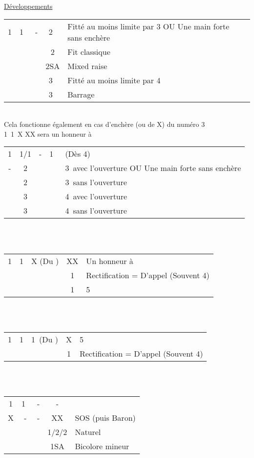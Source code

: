 \documentclass[a4paper, oneside, 11pt]{report}
\begin{document}
	\underline{Développements}\\
	\begin{tabular}{cccc|l}
	1\carreau & 1\coeur\  & - & 2\carreau\ & Fitté au moins limite par 3 OU Une main forte sans enchère\\
	&&& 2\coeur & Fit classique\\
	&&& 2SA & Mixed raise\\
	&&& 3\carreau\ & Fitté au moins limite par 4\\
	&&& 3\coeur\ & Barrage\\
	\end{tabular}\\
	Cela fonctionne également en cas d'enchère (ou de X) du numéro 3\\
	1\carreau\ 1\coeur\ X XX sera un honneur à \coeur\\

	\begin{tabular}{cccc|l}
	1\trefle & 1\carreau/1\coeur  & - & 1\pique\ & (Dès 4\pique)\\
	- & 2\trefle &&& 3\pique\ avec l'ouverture OU Une main forte sans enchère\\
	& 2\pique &&& 3\pique\ sans l'ouverture\\
	& 3\trefle &&& 4\pique\ avec l'ouverture\\
	& 3\pique &&& 4\pique\ sans l'ouverture\\
	\end{tabular}\\\\

	\begin{tabular}{cccc|l}
	1\trefle & 1\carreau & X (Du \coeur) & XX & Un honneur à \carreau\\
	&&& 1\coeur & Rectification = D'appel (Souvent 4\pique)\\
	&&& 1\pique & 5\pique\\
	\end{tabular}\\\\

	\begin{tabular}{cccc|l}
	1\trefle & 1\carreau & 1\coeur\ (Du \pique) & X & 5\coeur\\
	&&& 1\pique & Rectification = D'appel (Souvent 4\coeur)\\
	\end{tabular}\\\\

	\begin{tabular}{cccc|l}
	1\trefle & 1\coeur\  & - & - &\\
	X & - & - & XX & SOS (puis Baron)\\
	&&& 1\pique/2\trefle/2\carreau & Naturel\\
	&&& 1SA & Bicolore mineur\\
	\end{tabular}\\\\
\end{document}
